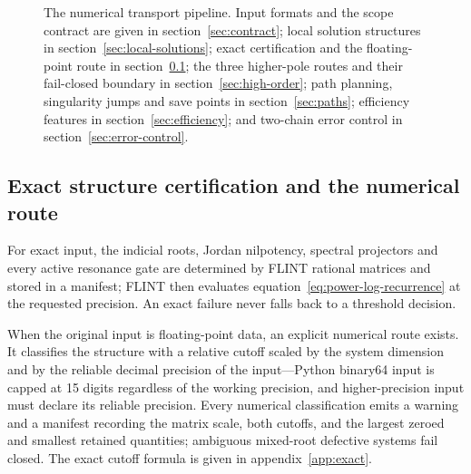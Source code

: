 \documentclass[11pt,a4paper]{article}
\begin{document}
\begin{figure}[p]
\caption{The numerical transport pipeline. Input formats and the scope contract are given in
section~\ref{sec:contract}; local solution structures in section~\ref{sec:local-solutions};
exact certification and the floating-point route in section~\ref{sec:certification}; the
three higher-pole routes and their fail-closed boundary in section~\ref{sec:high-order};
path planning, singularity jumps and save points in section~\ref{sec:paths}; efficiency
features in section~\ref{sec:efficiency}; and two-chain error control in
section~\ref{sec:error-control}.}
\label{fig:transport-workflow}
\end{figure}

\subsection{Exact structure certification and the numerical route}
\label{sec:certification}

For exact input, the indicial roots, Jordan nilpotency, spectral projectors and every
active resonance gate are determined by FLINT rational matrices and stored in a manifest;
FLINT then evaluates equation~\eqref{eq:power-log-recurrence} at the requested precision.
An exact failure never falls back to a threshold decision.

When the original input is floating-point data, an explicit numerical route exists. It
classifies the structure with a relative cutoff scaled by the system dimension and by the
reliable decimal precision of the input---Python binary64 input is capped at 15 digits
regardless of the working precision, and higher-precision input must declare its reliable
precision. Every numerical classification emits a warning and a manifest recording the
matrix scale, both cutoffs, and the largest zeroed and smallest retained quantities;
ambiguous mixed-root defective systems fail closed. The exact cutoff formula is given in
appendix~\ref{app:exact}.
\end{document}
